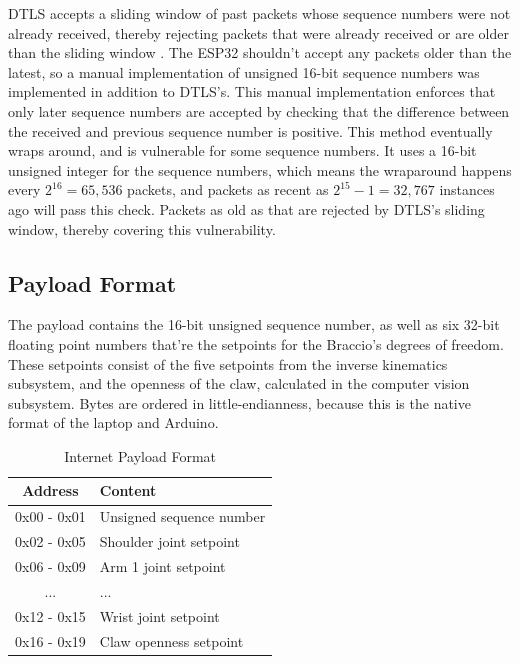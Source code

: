 \newpage
DTLS accepts a sliding window of past packets whose sequence numbers were not already received, thereby rejecting packets that were already received or are older than the sliding window \cite{bib:dtls1.2}. The ESP32 shouldn't accept any packets older than the latest, so a manual implementation of unsigned 16-bit sequence numbers was implemented in addition to DTLS's. This manual implementation enforces that only later sequence numbers are accepted by checking that the difference between the received and previous sequence number is positive. This method eventually wraps around, and is vulnerable for some sequence numbers. It uses a 16-bit unsigned integer for the sequence numbers, which means the wraparound happens every $2^{16}=65,536$ packets, and packets as recent as $2^{15}-1=32,767$ instances ago will pass this check. Packets as old as that are rejected by DTLS's sliding window, thereby covering this vulnerability.

\subsection{Payload Format}
The payload contains the 16-bit unsigned sequence number, as well as six 32-bit floating point numbers that're the setpoints for the Braccio's degrees of freedom. These setpoints consist of the five setpoints from the inverse kinematics subsystem, and the openness of the claw, calculated in the computer vision subsystem. Bytes are ordered in little-endianness, because this is the native format of the laptop and Arduino.

\begin{table}[h!]
\centering
\caption{Internet Payload Format}
\label{tab_net:internet_payload_format}
\small{
\begin{tabular}{|c|l|}
    \hline
    \textbf{Address} & \textbf{Content} \\
    \hline \hline
    0x00 - 0x01 & Unsigned sequence number \\
    \hline
    0x02 - 0x05 & Shoulder joint setpoint \\
    \hline
    0x06 - 0x09 & Arm 1 joint setpoint \\
    \hline
    ... & ... \\
    \hline
    0x12 - 0x15 & Wrist joint setpoint \\
    \hline
    0x16 - 0x19 & Claw openness setpoint \\
    \hline
\end{tabular}
}
\end{table}


